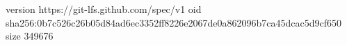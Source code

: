 version https://git-lfs.github.com/spec/v1
oid sha256:0b7c526c26b05d84ad6ec3352ff8226e2067de0a862096b7ca45dcac5d9cf650
size 349676
